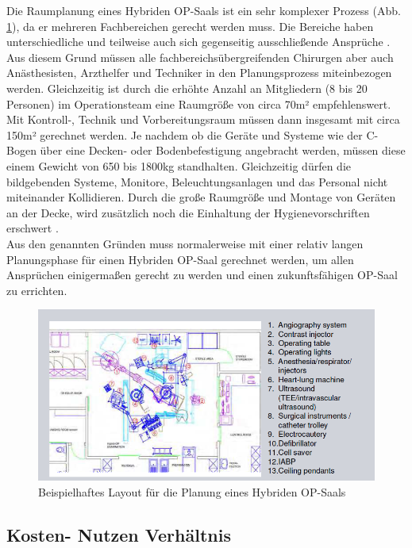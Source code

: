 Die Raumplanung eines Hybriden OP-Saals ist ein sehr komplexer Prozess (Abb. \ref{fig:roomplanning}), da er mehreren Fachbereichen gerecht werden muss. Die Bereiche haben unterschiedliche und teilweise auch sich gegenseitig ausschließende Ansprüche \cite{TechnicalConsiderations}. Aus diesem Grund müssen alle fachbereichsübergreifenden Chirurgen aber auch Anästhesisten, Arzthelfer und Techniker in den Planungsprozess miteinbezogen werden.
Gleichzeitig ist durch die erhöhte Anzahl an Mitgliedern (8 bis 20 Personen) im Operationsteam eine Raumgröße von circa 70m² empfehlenswert. Mit Kontroll-, Technik und Vorbereitungsraum müssen dann insgesamt mit circa 150m² gerechnet werden. Je nachdem ob die Geräte und Systeme wie der C-Bogen über eine Decken- oder Bodenbefestigung angebracht werden, müssen diese einem Gewicht von 650 bis 1800kg standhalten. Gleichzeitig dürfen die bildgebenden Systeme, Monitore, Beleuchtungsanlagen und das Personal nicht miteinander Kollidieren. Durch die große Raumgröße und Montage von Geräten an der Decke, wird zusätzlich noch die Einhaltung der Hygienevorschriften erschwert \cite{TechnicalConsiderations}.\\ 
Aus den genannten Gründen muss normalerweise mit einer relativ langen Planungsphase für einen Hybriden OP-Saal gerechnet werden, um allen Ansprüchen einigermaßen gerecht zu werden und einen zukunftsfähigen OP-Saal zu errichten.

\begin{figure} [H]
	\includegraphics[scale = 0.7]{Content/Pictures/roomplanning.png}
	\caption{Beispielhaftes Layout für die Planung eines Hybriden OP-Saals \cite{HybridOR}}
	\label{fig:roomplanning}
\end{figure}

\subsection{Kosten- Nutzen Verhältnis}

